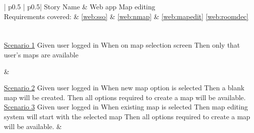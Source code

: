 \begin{longtable}{| p{} | p{}|}
	\hline
	\newline Story Name & \newline Web app Map editing\\\hline
	\newline Requirements covered: & \newline \ref{web:sso} \& \ref{web:nmap} \& \ref{web:mapedit} \ref{web:roomdec} \\\hline
	\\\hline
	\\\hline
	\newline\underline{Scenario 1}\newline
	Given user logged in \newline
	When on map selection screen \newline 
	Then only that user's maps are available\newline
	
	&
	
	\newline\underline{Scenario 2}\newline
	Given user logged in \newline
	When new map option is selected \newline 
	Then a blank map will be created.\newline
	Then all options required to create a map will be available.\newline
	\\\hline
	\newline\underline{Scenario 3}\newline
	Given user logged in \newline
	When existing map is selected \newline 
	Then map editing system will start with the selected map\newline
	Then all options required to create a map will be available.\newline
	&
	\\\hline
\end{longtable}
